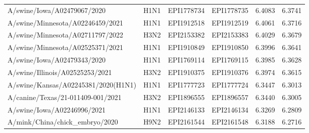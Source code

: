 \begin{tabular}{L{1.95in}|L{.25in}|L{.60in}|L{.6in}|C{1in}|C{1in}}
 A/swine/Iowa/A02479067/2020 &H1N1&EPI1778734&EPI1778735&6.4083&6.3741\\
 A/swine/Minnesota/A02246459/2021 &H1N1&EPI1912518&EPI1912519&6.4061&6.3716\\
 A/swine/Minnesota/A02711797/2022 &H3N2&EPI2153382&EPI2153383&6.4029&6.3679\\
 A/swine/Minnesota/A02525371/2021 &H1N1&EPI1910849&EPI1910850&6.3996&6.3641\\
 A/swine/Iowa/A02479343/2020 &H1N1&EPI1769114&EPI1769115&6.3985&6.3628\\
 A/swine/Illinois/A02525253/2021 &H3N2&EPI1910375&EPI1910376&6.3974&6.3615\\
 A/swine/Kansas/A02245381/2020(H1N1) &H1N1&EPI1777723&EPI1777724&6.3447&6.3013\\
 A/canine/Texas/21-011409-001/2021 &H3N2&EPI1896555&EPI1896557&6.3440&6.3005\\
 A/swine/Iowa/A02246996/2021 &H1N1&EPI2146133&EPI2146134&6.3269&6.2809\\
 A/mink/China/chick\_embryo/2020 &H9N2&EPI2161544&EPI2161548&6.3188&6.2716\\
\hline\end{tabular}
